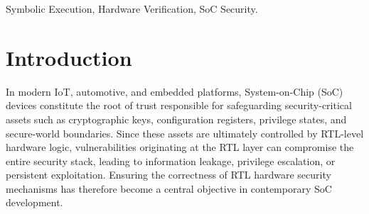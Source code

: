 \documentclass[conference]{IEEEtran}
\begin{document}
\begin{abstract}
Ensuring the security of modern SoCs is increasingly critical, yet verifying security behaviors at the hardware level remains highly challenging due to complex RTL interactions and limited coverage of traditional methods. Symbolic execution is a powerful verification technique that systematically explores all feasible paths, yet it has faced the critical challenge of path explosion since its emergence. Recent work has begun to focus on performing verification directly on RTL source code, explicitly exploiting RTL-specific characteristics, such as exploit independent modules in RTL designs to reduce path exploration by avoiding re-execution of identical modules. However, these techniques cannot eliminate redundant path explorations within individual modules. To address this limitation, we propose a dataflow-based symbolic execution technique for efficient path exploration. Our approach targets on combinational logic circuits and introduces a novel pruning strategy based on forward dataflow analysis to  to avoid redundant path exploration. We evaluate our approach on two open-source RISC-V cores(PICORV32 and DarkRISCV) and a SoC design. Experimental results demonstrate that our technique reduces path exploration by approximately 10\% to 34\%.
\end{abstract}

\begin{IEEEkeywords}
Symbolic Execution, Hardware Verification, SoC Security.
\end{IEEEkeywords}
\vspace{-8pt}
\section{Introduction}
In modern IoT, automotive, and embedded platforms, System-on-Chip (SoC) devices constitute the root of trust responsible for safeguarding security-critical assets such as cryptographic keys, configuration registers, privilege states, and secure-world boundaries. Since these assets are ultimately controlled by RTL-level hardware logic, vulnerabilities originating at the RTL layer can compromise the entire security stack, leading to information leakage, privilege escalation, or persistent exploitation\cite{chen_challenges_2017}. Ensuring the correctness of RTL hardware security mechanisms has therefore become a central objective in contemporary SoC development.
\end{document}
